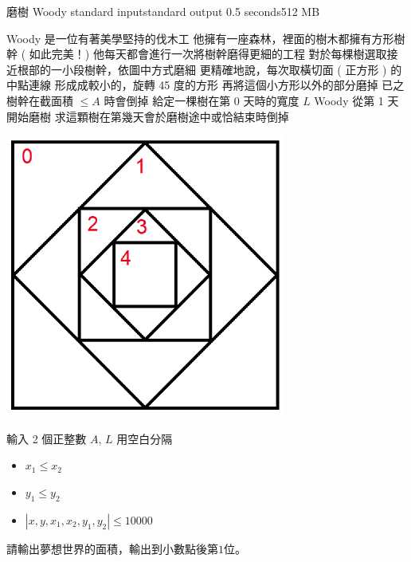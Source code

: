 \gdef\thisproblemauthor{}
\gdef\thisproblemdeveloper{}
\gdef\thisproblemorigin{}
\begin{problem}{磨樹 Woody}
{standard input}{standard output}
{0.5 seconds}{512 MB}{}

Woody 是一位有著美學堅持的伐木工 \newline
他擁有一座森林，裡面的樹木都擁有方形樹幹 ( 如此完美！) \newline
他每天都會進行一次將樹幹磨得更細的工程 \newline
對於每棵樹選取接近根部的一小段樹幹，依圖中方式磨細 \newline
\newline
更精確地說，每次取橫切面 ( 正方形 ) 的中點連線 \newline
形成成較小的，旋轉 45 度的方形 \newline
再將這個小方形以外的部分磨掉 \newline
\newline
已之樹幹在截面積 $ \leq A $ 時會倒掉 \newline
給定一棵樹在第 0 天時的寬度 $ L $ \newline
Woody 從第 1 天開始磨樹 \newline
求這顆樹在第幾天會於磨樹途中或恰結束時倒掉 \newline

\centerline{\includegraphics[scale=0.6]{./pics/A.png}}


\InputFile

輸入 2 個正整數 $ A $, $ L $ \newline
用空白分隔 \newline

\begin{iofmt}
\begin{itemize}
	\item $x_1\leq x_2$
	\item $y_1\leq y_2$
	\item $|x,y,x_1,x_2,y_1,y_2|\leq 10000$
\end{itemize}
\end{iofmt}

\OutputFile

請輸出夢想世界的面積，輸出到小數點後第$1$位。

\Examples

\begin{example}
%
\end{example}

\end{problem}
